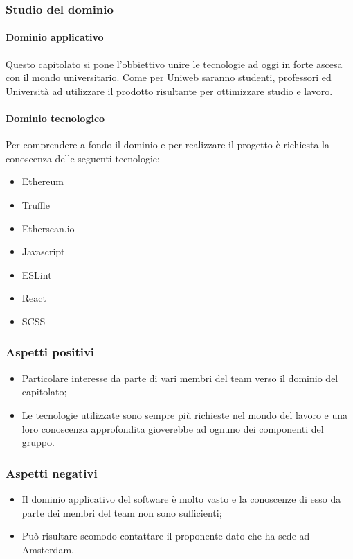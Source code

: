 		\subsubsection{Studio del dominio}
			\paragraph{Dominio applicativo} \Spazio
			Questo capitolato si pone l'obbiettivo unire le tecnologie ad oggi in forte ascesa con il mondo universitario. Come per Uniweb saranno studenti, professori ed Università ad utilizzare il prodotto risultante per ottimizzare studio e lavoro.
			\paragraph{Dominio tecnologico} \Spazio
			Per comprendere a fondo il dominio e per realizzare il progetto è richiesta la conoscenza delle seguenti tecnologie:
			\begin{itemize}
				\item Ethereum
				\item Truffle
				\item Etherscan.io
				\item Javascript
				\item ESLint
				\item React
				\item SCSS
			\end{itemize}
		\subsubsection{Aspetti positivi}
		\begin{itemize}
			\item Particolare interesse da parte di vari membri del team verso il dominio del capitolato;
			\item Le tecnologie utilizzate sono sempre più richieste nel mondo del lavoro e una loro conoscenza approfondita gioverebbe ad ognuno dei componenti del gruppo.
		\end{itemize}
		\subsubsection{Aspetti negativi}
		\begin{itemize}
			\item Il dominio applicativo del software è molto vasto e la conoscenze di esso da parte dei membri del team non sono sufficienti;
			\item Può risultare scomodo contattare il proponente dato che ha sede ad Amsterdam.
		\end{itemize}

